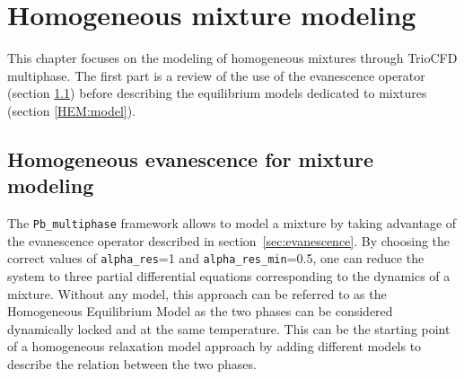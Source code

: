 \chapter{Homogeneous mixture modeling}
This chapter focuses on the modeling of homogeneous mixtures through TrioCFD multiphase. The first part is a review of the use of the evanescence operator (section \ref{HEM:eva}) before describing the equilibrium models dedicated to mixtures (section \ref{HEM:model}).
\section{Homogeneous evanescence for mixture modeling}\label{HEM:eva}
The \texttt{Pb_multiphase} framework allows to model a mixture by taking advantage of the evanescence operator described in section~\ref{sec:evanescence}. By choosing the correct values of \texttt{alpha_res}=1 and \texttt{alpha_res_min}=0.5, one can reduce the system to three partial differential equations corresponding to the dynamics of a mixture. Without any model, this approach can be referred to as the Homogeneous Equilibrium Model as the two phases can be considered dynamically locked and at the same temperature. This can be the starting point of a homogeneous relaxation model approach by adding different models to describe the relation between the two phases.



